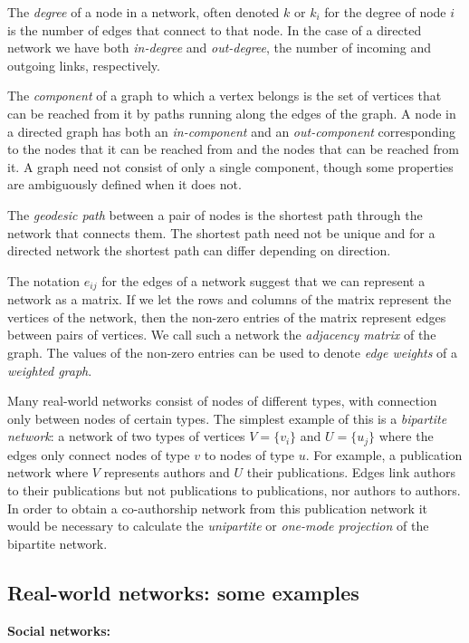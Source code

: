 \documentclass{article}
\begin{document}
The \emph{degree} of a node in a network, often denoted $k$ or $k_i$ for the degree of node $i$ is the number of edges that connect to that node. In the case of a directed network we have both \emph{in-degree} and \emph{out-degree}, the number of incoming and outgoing links, respectively.

The \emph{component} of a graph to which a vertex belongs is the set of vertices that can be reached from it by paths running along the edges of the graph. A node in a directed graph has both an \emph{in-component} and an \emph{out-component} corresponding to the nodes that it can be reached from and the nodes that can be reached from it. A graph need not consist of only a single component, though some properties are ambiguously defined when it does not.

The \emph{geodesic path} between a pair of nodes is the shortest path through the network that connects them. The shortest path need not be unique and for a directed network the shortest path can differ depending on direction.

The notation $e_{ij}$ for the edges of a network suggest that we can represent a network as a matrix. If we let the rows and columns of the matrix represent the vertices of the network, then the non-zero entries of the matrix represent edges between pairs of vertices. We call such a network the \emph{adjacency matrix} of the graph. The values of the non-zero entries can be used to denote \emph{edge weights} of a \emph{weighted graph}.

Many real-world networks consist of nodes of different types, with connection only between nodes of certain types. The simplest example of this is a \emph{bipartite network}: a network of two types of vertices $V=\{v_i\}$ and $U=\{u_j\}$ where the edges only connect nodes of type $v$ to nodes of type $u$. For example, a publication network where $V$ represents authors and $U$ their publications. Edges link authors to their publications but not publications to publications, nor authors to authors. In order to obtain a co-authorship network from this publication network it would be necessary to calculate the \emph{unipartite} or \emph{one-mode projection} of the bipartite network.


\subsection{Real-world networks: some examples}

{\bf Social networks:} 
\end{document}

